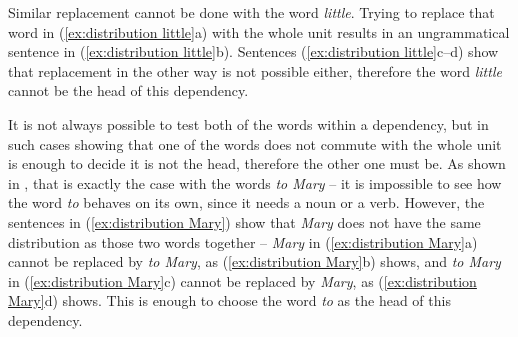 \begin{exe}
    \ex
    \label{ex:distribution boy}
    \begin{xlist}
    \end{xlist}
\end{exe}

Similar replacement cannot be done with the word \textsl{little}. Trying to replace that word in (\ref{ex:distribution little}a) with the whole unit results in an ungrammatical sentence in (\ref{ex:distribution little}b). Sentences (\ref{ex:distribution little}c--d) show that replacement in the other way is not possible either, therefore the word \textsl{little} cannot be the head of this dependency.

\begin{exe}
    \ex
    \label{ex:distribution little}
	\begin{xlist}
    \end{xlist}
\end{exe}

It is not always possible to test both of the words within a dependency, but in such cases showing that one of the words does not commute with the whole unit is enough to decide it is not the head, therefore the other one must be. As shown in \cite{gerdes-etal-2018-sud}, that is exactly the case with the words \textsl{to Mary} -- it is impossible to see how the word \textsl{to} behaves on its own, since it needs a noun or a verb. However, the sentences in (\ref{ex:distribution Mary}) show that \textsl{Mary} does not have the same distribution as those two words together -- \textsl{Mary} in (\ref{ex:distribution Mary}a) cannot be replaced by \textsl{to Mary}, as (\ref{ex:distribution Mary}b) shows, and \textsl{to Mary} in (\ref{ex:distribution Mary}c) cannot be replaced by \textsl{Mary}, as (\ref{ex:distribution Mary}d) shows. This is enough to choose the word \textsl{to} as the head of this dependency.

\begin{exe}
    \ex
    \label{ex:distribution Mary}
    \begin{xlist}
    \end{xlist}
\end{exe}

